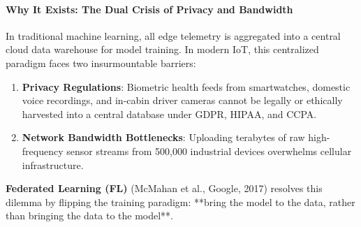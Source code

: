 \paragraph{Why It Exists: The Dual Crisis of Privacy and Bandwidth}
In traditional machine learning, all edge telemetry is aggregated into a central cloud data warehouse for model training. In modern IoT, this centralized paradigm faces two insurmountable barriers:
\begin{enumerate}
    \item \textbf{Privacy Regulations}: Biometric health feeds from smartwatches, domestic voice recordings, and in-cabin driver cameras cannot be legally or ethically harvested into a central database under GDPR, HIPAA, and CCPA.
    \item \textbf{Network Bandwidth Bottlenecks}: Uploading terabytes of raw high-frequency sensor streams from 500,000 industrial devices overwhelms cellular infrastructure.
\end{enumerate}

\textbf{Federated Learning (FL)} (McMahan et al., Google, 2017) resolves this dilemma by flipping the training paradigm: **bring the model to the data, rather than bringing the data to the model**.

